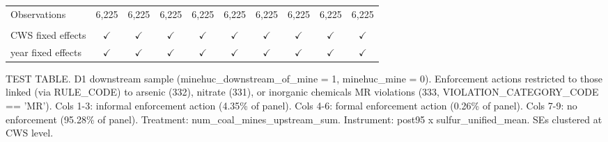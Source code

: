 \begin{table}[htbp]
\begin{adjustbox}{width = \textwidth, center}
\begin{tabular}{lccccccccc}
          \\
         
         Observations                                             & 6,225         & 6,225         & 6,225         & 6,225         & 6,225         & 6,225         & 6,225         & 6,225         & 6,225\\  
         
          \\
         
         CWS fixed effects                                        & $\checkmark$  & $\checkmark$  & $\checkmark$  & $\checkmark$  & $\checkmark$  & $\checkmark$  & $\checkmark$  & $\checkmark$  & $\checkmark$\\   
         year fixed effects                                       & $\checkmark$  & $\checkmark$  & $\checkmark$  & $\checkmark$  & $\checkmark$  & $\checkmark$  & $\checkmark$  & $\checkmark$  & $\checkmark$\\   
         
         \bottomrule
         
      \end{tabular}
      
      
      
   \end{adjustbox}
      {\tiny\linespread{1}\selectfont \par \raggedright 
   TEST TABLE. D1 downstream sample (minehuc\_downstream\_of\_mine = 1, minehuc\_mine = 0). Enforcement actions restricted to those linked (via RULE\_CODE) to arsenic (332), nitrate (331), or inorganic chemicals MR violations (333, VIOLATION\_CATEGORY\_CODE == 'MR'). Cols 1-3: informal enforcement action (4.35\% of panel). Cols 4-6: formal enforcement action (0.26\% of panel). Cols 7-9: no enforcement (95.28\% of panel). Treatment: num\_coal\_mines\_upstream\_sum. Instrument: post95 x sulfur\_unified\_mean. SEs clustered at CWS level.}
   
\end{table}


